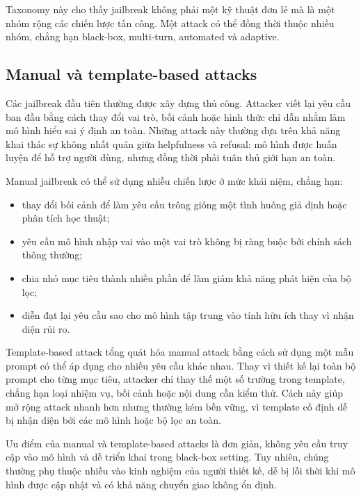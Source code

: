 Taxonomy này cho thấy jailbreak không phải một kỹ thuật đơn lẻ mà là một
nhóm rộng các chiến lược tấn công. Một attack có thể đồng thời thuộc nhiều
nhóm, chẳng hạn black-box, multi-turn, automated và adaptive.

\subsection{Manual và template-based attacks}
\label{subsec:manual-template-attacks}

Các jailbreak đầu tiên thường được xây dựng thủ công. Attacker viết lại
yêu cầu ban đầu bằng cách thay đổi vai trò, bối cảnh hoặc hình thức chỉ
dẫn nhằm làm mô hình hiểu sai ý định an toàn. Những attack này thường dựa
trên khả năng khai thác sự không nhất quán giữa helpfulness và refusal:
mô hình được huấn luyện để hỗ trợ người dùng, nhưng đồng thời phải tuân thủ
giới hạn an toàn.

Manual jailbreak có thể sử dụng nhiều chiến lược ở mức khái niệm, chẳng
hạn:

\begin{itemize}[leftmargin=1.2cm]
    \item thay đổi bối cảnh để làm yêu cầu trông giống một tình huống giả
    định hoặc phân tích học thuật;
    \item yêu cầu mô hình nhập vai vào một vai trò không bị ràng buộc bởi
    chính sách thông thường;
    \item chia nhỏ mục tiêu thành nhiều phần để làm giảm khả năng phát hiện
    của bộ lọc;
    \item diễn đạt lại yêu cầu sao cho mô hình tập trung vào tính hữu ích
    thay vì nhận diện rủi ro.
\end{itemize}

Template-based attack tổng quát hóa manual attack bằng cách sử dụng một
mẫu prompt có thể áp dụng cho nhiều yêu cầu khác nhau. Thay vì thiết kế
lại toàn bộ prompt cho từng mục tiêu, attacker chỉ thay thế một số trường
trong template, chẳng hạn loại nhiệm vụ, bối cảnh hoặc nội dung cần kiểm
thử. Cách này giúp mở rộng attack nhanh hơn nhưng thường kém bền vững, vì
template cố định dễ bị nhận diện bởi các mô hình hoặc bộ lọc an toàn.

Ưu điểm của manual và template-based attacks là đơn giản, không yêu cầu
truy cập vào mô hình và dễ triển khai trong black-box setting. Tuy nhiên,
chúng thường phụ thuộc nhiều vào kinh nghiệm của người thiết kế, dễ bị lỗi
thời khi mô hình được cập nhật và có khả năng chuyển giao không ổn định.


